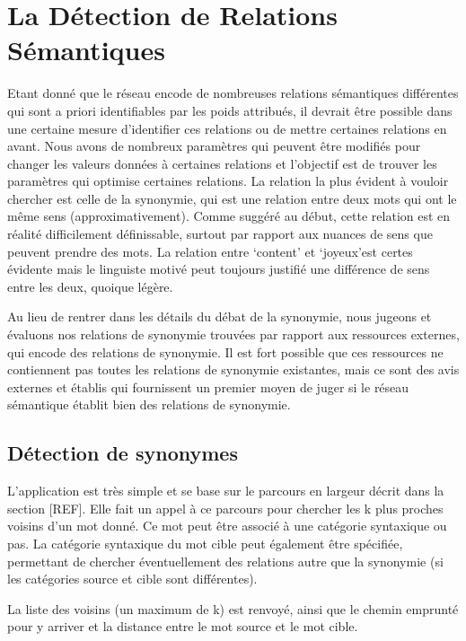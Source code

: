 \section{La Détection de Relations Sémantiques}

Etant donné que le réseau encode de nombreuses relations sémantiques 
différentes qui sont a priori identifiables par les poids attribués, il devrait 
être possible dans une certaine mesure d'identifier ces relations ou de mettre 
certaines relations en avant. Nous avons de nombreux paramètres qui peuvent être 
modifiés pour changer les valeurs données à certaines relations et l'objectif 
est de trouver les paramètres qui optimise certaines relations. La relation la 
plus évident à vouloir chercher est celle de la synonymie, qui est une relation 
entre deux mots qui ont le même sens (approximativement). Comme suggéré au 
début, cette relation est en réalité difficilement définissable, surtout par 
rapport aux nuances de sens que peuvent prendre des mots. La relation entre 
\lq{content}\rq{} et \lq{joyeux}\rq est certes évidente mais le linguiste motivé 
peut toujours justifié une différence de sens entre les deux, quoique légère.

Au lieu de rentrer dans les détails du débat de la synonymie, nous jugeons et 
évaluons nos relations de synonymie trouvées par rapport aux ressources 
externes, qui encode des relations de synonymie. Il est fort possible que ces 
ressources ne contiennent pas toutes les relations de synonymie existantes, mais 
ce sont des avis externes et établis qui fournissent un premier moyen de juger 
si le réseau sémantique établit bien des relations de synonymie.

\subsection{Détection de synonymes}

L'application est très simple et se base sur le parcours en largeur décrit dans 
la section [REF]. Elle fait un appel à ce parcours pour chercher les k plus 
proches voisins d'un mot donné. Ce mot peut être associé à une catégorie 
syntaxique ou pas. La catégorie syntaxique du mot cible peut également être 
spécifiée, permettant de chercher éventuellement des relations autre que la 
synonymie (si les catégories source et cible sont différentes).

La liste des voisins (un maximum de k) est renvoyé, ainsi que le chemin 
emprunté pour y arriver et la distance entre le mot source et le mot cible.

